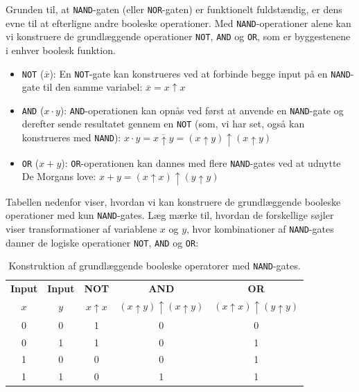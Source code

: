 Grunden til, at \texttt{NAND}-gaten (eller \texttt{NOR}-gaten) er funktionelt fuldstændig, er dens evne til at efterligne andre booleske operationer. Med \texttt{NAND}-operationer alene kan vi konstruere de grundlæggende operationer \texttt{NOT}, \texttt{AND} og \texttt{OR}, som er byggestenene i enhver boolesk funktion.

\begin{itemize}
\setlength{\itemsep}{10pt}
    \item \texttt{NOT} (\(\overline{x}\)): En \texttt{NOT}-gate kan konstrueres ved at forbinde begge input på en \texttt{NAND}-gate til den samme variabel:
    \(
    \overline{x} = x \uparrow x
    \)

    \item \texttt{AND} (\(x \cdot y\)): \texttt{AND}-operationen kan opnås ved først at anvende en \texttt{NAND}-gate og derefter sende resultatet gennem en \texttt{NOT} (som, vi har set, også kan konstrueres med \texttt{NAND}): \newline
   $x \cdot y=\overline{x \uparrow y}=(x \uparrow y) \uparrow(x \uparrow y)$

    \item \texttt{OR} (\(x + y\)): \texttt{OR}-operationen kan dannes med flere \texttt{NAND}-gates ved at udnytte De Morgans love:
    \(
    x + y = (x \uparrow x) \uparrow (y \uparrow y)
    \)
\end{itemize}


Tabellen nedenfor viser, hvordan vi kan konstruere de grundlæggende booleske operationer med kun \texttt{NAND}-gates. Læg mærke til, hvordan de forskellige søjler viser transformationer af variablene $x$ og $y$, hvor kombinationer af \texttt{NAND}-gates danner de logiske operationer \texttt{NOT}, \texttt{AND} og \texttt{OR}:

\begin{table}[h!]
    \begin{center}
    \renewcommand{\arraystretch}{1.5} %
    \begin{tabular}{|c|c|c|c|c|}
    \textbf{Input} & \textbf{Input} & \textbf{NOT} & \textbf{AND} & \textbf{OR} \\
    $x$ & $y$ & $x \uparrow x$ & $(x \uparrow y) \uparrow (x \uparrow y)$ & $(x \uparrow x) \uparrow (y \uparrow y)$ \\
    \hline
    0 & 0 & 1 & 0 & 0 \\
    0 & 1 & 1 & 0 & 1 \\
    1 & 0 & 0 & 0 & 1 \\
    1 & 1 & 0 & 1 & 1 \\
    \end{tabular}
    \end{center}
    \caption{Konstruktion af grundlæggende booleske operatorer med \texttt{NAND}-gates.}
\end{table}

